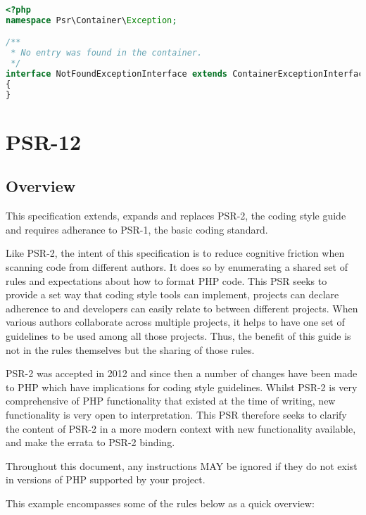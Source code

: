 \begin{lstlisting}[language=PHP]
<?php
namespace Psr\Container\Exception;

/**
 * No entry was found in the container.
 */
interface NotFoundExceptionInterface extends ContainerExceptionInterface
{
}
\end{lstlisting}


\chapter{PSR-12}


\section{Overview}


This specification extends, expands and replaces PSR-2, the coding style guide and requires adherance to PSR-1, the basic coding standard.

Like PSR-2, the intent of this specification is to reduce cognitive friction when scanning code from different authors. It does so by enumerating a shared set of rules and expectations about how to format PHP code. This PSR seeks to provide a set way that coding style tools can implement, projects can declare adherence to and developers can easily relate to between different projects. When various authors collaborate across multiple projects, it helps to have one set of guidelines to be used among all those projects. Thus, the benefit of this guide is not in the rules themselves but the sharing of those rules.

PSR-2 was accepted in 2012 and since then a number of changes have been made to PHP which have implications for coding style guidelines. Whilst PSR-2 is very comprehensive of PHP functionality that existed at the time of writing, new functionality is very open to interpretation. This PSR therefore seeks to clarify the content of PSR-2 in a more modern context with new functionality available, and make the errata to PSR-2 binding.



Throughout this document, any instructions MAY be ignored if they do not exist in versions of PHP supported by your project.

This example encompasses some of the rules below as a quick overview:




